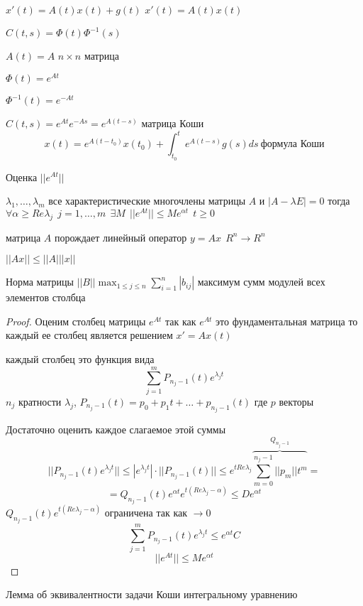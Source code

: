 \begin{define}
  $x'(t) = A(t)x(t) + g(t)$
  $x'(t) = A(t)x(t)$

  $C(t,s) = \Phi(t) \Phi^{-1}(s)$

  $A(t) = A$ $n \times n$ матрица

  $\Phi(t) = e^{At}$

  $\Phi^{-1}(t) = e^{-At}$

  $C(t,s) = e^{At} e^{-As} = e^{A(t-s)}$ матрица Коши
  $$
  x(t) = e^{A(t-t_0)}x(t_0) + \int_{t_0}^t e^{A(t-s)}g(s)ds ~ \text{формула
  Коши}
  $$
\end{define}

\begin{title}[\Large]
  Оценка $||e^{At}||$
\end{title}

\begin{theorem}
  $\lambda_1, \ldots, \lambda_m$ все характеристические многочлены матрицы $A$
  и $|A - \lambda E| = 0$ тогда $\forall \alpha \ge Re\lambda_j ~~
  j = 1, \ldots, m ~~ \exists M ~~ ||e^{At}|| \le Me^{\alpha t} ~~ t \ge 0$

  матрица $A$ порождает линейный оператор $y=Ax ~~ R^n \to R^n$

  $||Ax|| \le ||A|||x||$

  Норма матрицы $||B|| \max_{1 \le j \le n} \sum_{i=1}^n |b_{ij}|$ максимум
  сумм модулей всех элементов столбца
\end{theorem}

\begin{proof}
  Оценим столбец матрицы $e^{At}$ так как $e^{At}$ это фундаментальная матрица
  то каждый ее столбец является решением $x'=Ax(t)$

  каждый столбец это функция вида
  $$
  \sum_{j=1}^m P_{n_j-1}(t) e^{\lambda_j t}
  $$
  $n_j$ кратности $\lambda_j$, $P_{n_j-1}(t) = p_0 + p_1t + \ldots +
  p_{n_j-1}(t)$ где $p$ векторы

  Достаточно оценить каждое слагаемое этой суммы
  $$
  ||P_{n_j-1}(t)e^{\lambda_j t}|| \le |e^{\lambda_j t}|\cdot||P_{n_j-1}(t)||\le
  e^{tRe\lambda_j} \overbrace{\sum_{m=0}^{n_j-1} ||p_m||t^m}^{Q_{n_j-1}} =
  $$
  $$
  = Q_{n_j-1}(t)e^{\alpha t} e^{t(Re\lambda_j-\alpha)} \le De^{\alpha t}
  $$
  $Q_{n_j-1}(t)e^{t(Re\lambda_j-\alpha)}$ ограничена так как $\to 0$
  $$
  \sum_{j=1}^m P_{n_j-1}(t)e^{\lambda_j t} \le e^{\alpha t} C
  $$
  $$
  ||e^{At}|| \le Me^{\alpha t}
  $$
\end{proof}

\begin{title}[\Large]
  Лемма об эквивалентности задачи Коши интегральному уравнению
\end{title}

